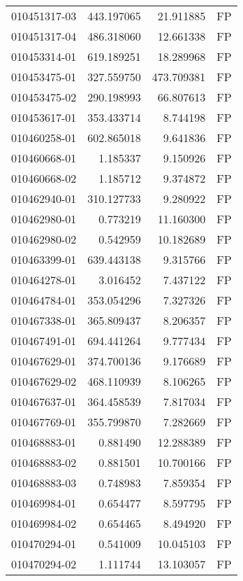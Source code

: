 \begin{tabular}{lrrl}
010451317-03 &  443.197065 &      21.911885 &   FP \\
010451317-04 &  486.318060 &      12.661338 &   FP \\
010453314-01 &  619.189251 &      18.289968 &   FP \\
010453475-01 &  327.559750 &     473.709381 &   FP \\
010453475-02 &  290.198993 &      66.807613 &   FP \\
010453617-01 &  353.433714 &       8.744198 &   FP \\
010460258-01 &  602.865018 &       9.641836 &   FP \\
010460668-01 &    1.185337 &       9.150926 &   FP \\
010460668-02 &    1.185712 &       9.374872 &   FP \\
010462940-01 &  310.127733 &       9.280922 &   FP \\
010462980-01 &    0.773219 &      11.160300 &   FP \\
010462980-02 &    0.542959 &      10.182689 &   FP \\
010463399-01 &  639.443138 &       9.315766 &   FP \\
010464278-01 &    3.016452 &       7.437122 &   FP \\
010464784-01 &  353.054296 &       7.327326 &   FP \\
010467338-01 &  365.809437 &       8.206357 &   FP \\
010467491-01 &  694.441264 &       9.777434 &   FP \\
010467629-01 &  374.700136 &       9.176689 &   FP \\
010467629-02 &  468.110939 &       8.106265 &   FP \\
010467637-01 &  364.458539 &       7.817034 &   FP \\
010467769-01 &  355.799870 &       7.282669 &   FP \\
010468883-01 &    0.881490 &      12.288389 &   FP \\
010468883-02 &    0.881501 &      10.700166 &   FP \\
010468883-03 &    0.748983 &       7.859354 &   FP \\
010469984-01 &    0.654477 &       8.597795 &   FP \\
010469984-02 &    0.654465 &       8.494920 &   FP \\
010470294-01 &    0.541009 &      10.045103 &   FP \\
010470294-02 &    1.111744 &      13.103057 &   FP \\

\end{tabular}
